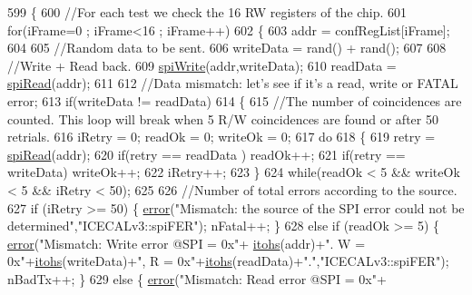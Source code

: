 \begin{DoxyCode}
599     \{
600         \textcolor{comment}{//For each test we check the 16 RW registers of the chip.}
601         \textcolor{keywordflow}{for}(iFrame=0 ; iFrame<16 ; iFrame++)
602         \{
603             addr = confRegList[iFrame];
604 
605             \textcolor{comment}{//Random data to be sent.}
606             writeData = rand() + rand();
607 
608             \textcolor{comment}{//Write + Read back.    }
609             \hyperlink{classICECALv3_aef00f02801dea4bda2093c930501dcdd}{spiWrite}(addr,writeData);
610             readData = \hyperlink{classICECALv3_aced41ce20a0853d6248b8df88412e57a}{spiRead}(addr);    
611 
612             \textcolor{comment}{//Data mismatch: let's see if it's a read, write or FATAL error;}
613             \textcolor{keywordflow}{if}(writeData != readData)
614             \{
615                 \textcolor{comment}{//The number of coincidences are counted. This loop will break when 5 R/W coincidences are
       found or after 50 retrials.}
616                 iRetry = 0;     readOk = 0;         writeOk = 0;
617                 \textcolor{keywordflow}{do}
618                 \{
619                     retry = \hyperlink{classICECALv3_aced41ce20a0853d6248b8df88412e57a}{spiRead}(addr);
620                     \textcolor{keywordflow}{if}(retry == readData )  readOk++;
621                     \textcolor{keywordflow}{if}(retry == writeData) writeOk++;
622                     iRetry++;
623                 \}
624                 \textcolor{keywordflow}{while}(readOk < 5 && writeOk < 5 && iRetry < 50);
625 
626                 \textcolor{comment}{//Number of total errors according to the source.}
627                 \textcolor{keywordflow}{if}          (iRetry >= 50) \{    \hyperlink{classObject_a204a95f57818c0f811933917a30eff45}{error}(\textcolor{stringliteral}{"Mismatch: the source of the SPI error could not
       be determined"},\textcolor{stringliteral}{"ICECALv3::spiFER"});     nFatal++;   \}
628                 \textcolor{keywordflow}{else} \textcolor{keywordflow}{if} (readOk >= 5)    \{  \hyperlink{classObject_a204a95f57818c0f811933917a30eff45}{error}(\textcolor{stringliteral}{"Mismatch: Write error @SPI = 0x"}+
      \hyperlink{classICECALv3_a04b02e583f191bfce34d05132cd23834}{itohs}(addr)+\textcolor{stringliteral}{". W = 0x"}+\hyperlink{classICECALv3_a04b02e583f191bfce34d05132cd23834}{itohs}(writeData)+\textcolor{stringliteral}{", R = 0x"}+\hyperlink{classICECALv3_a04b02e583f191bfce34d05132cd23834}{itohs}(readData)+\textcolor{stringliteral}{"."},\textcolor{stringliteral}{"ICECALv3::spiFER"});  
      nBadTx++;    \}
629                 \textcolor{keywordflow}{else}                                     \{  \hyperlink{classObject_a204a95f57818c0f811933917a30eff45}{error}(\textcolor{stringliteral}{"Mismatch: Read error @SPI = 0x"}+

\end{DoxyCode}
